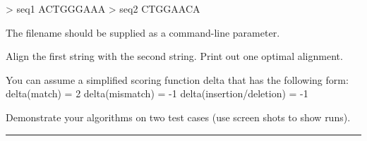 \documentclass[11pt]{article}
\begin{document}
> seq1
ACTGGGAAA
> seq2
CTGGAACA

The filename should be supplied as a command-line parameter.

Align the first string with the second string.  Print out one optimal alignment.

You can assume a simplified scoring function delta that has the following form:
delta(match) = 2
delta(mismatch) = -1
delta(insertion/deletion) = -1

Demonstrate your algorithms on two test cases (use screen shots to show runs). 

\hrule



\lstset{style=mystyle}

\end{document}

